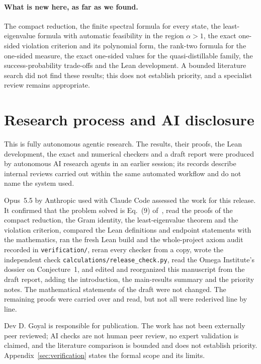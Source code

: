 \documentclass[11pt,a4paper]{article}
\theoremstyle{remark}\newtheorem{remark}[theorem]{Remark}
\begin{document}
\paragraph{What is new here, as far as we found.} The compact reduction,
the finite spectral formula for every state, the least-eigenvalue formula
with automatic feasibility in the region $\alpha>1$, the exact one-sided
violation criterion and its polynomial form, the rank-two formula for the
one-sided measure, the exact one-sided values for the quasi-distillable
family, the success-probability trade-offs and the Lean development. A
bounded literature search did not find these results; this does not
establish priority, and a specialist review remains appropriate.











\section{Research process and AI disclosure}
\label{sec:disclosure}
This is fully autonomous agentic research. The results, their proofs, the
Lean development, the exact and numerical checkers and a draft report were
produced by autonomous AI research agents in an earlier session; its records
describe internal reviews carried out within the same automated workflow
and do not name the system used.

Opus~5.5 by Anthropic used with Claude Code assessed the work for this
release. It confirmed that the problem solved is Eq.~(9) of~\cite{ducuara},
read the proofs of the compact reduction, the Gram identity, the
least-eigenvalue theorem and the violation criterion, compared the Lean
definitions and endpoint statements with the mathematics, ran the fresh
Lean build and the whole-project axiom audit recorded in
\texttt{verification/}, reran every checker from a copy, wrote the
independent check \texttt{calculations/release\_check.py}, read the Omega
Institute's dossier on Conjecture~1, and edited and reorganized this
manuscript from the draft report, adding the introduction, the main-results
summary and the priority notes. The mathematical statements of the draft
were not changed. The remaining proofs were carried over and read, but not
all were rederived line by line.

Dev D. Goyal is responsible for publication. The work has not been
externally peer reviewed; AI checks are not human peer review, no expert
validation is claimed, and the literature comparison is bounded and does
not establish priority. Appendix~\ref{sec:verification} states the formal
scope and its limits.
\end{document}
